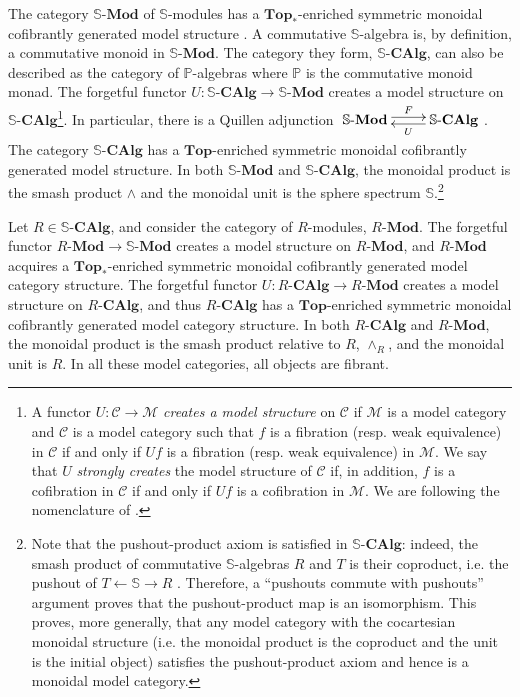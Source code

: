\documentclass[a4paper,11pt]{amsart} %
\theoremstyle{definition} \newtheorem{defn}[equation]{Definition}
\theoremstyle{remark} \newtheorem{notation}[equation]{Notation}
\theoremstyle{plain} \newtheorem{teo}[equation]{Theorem}
\theoremstyle{plain} \newtheorem{lema}[equation]{Lemma}
\theoremstyle{plain} \newtheorem{prop}[equation]{Proposition}
\theoremstyle{plain} \newtheorem{corolario}[equation]{Corollary}
\theoremstyle{remark} \newtheorem{obs}[equation]{Remark}
\theoremstyle{remark} \newtheorem{sideobs}[equation]{Side remark}
\theoremstyle{remark} \newtheorem{ejercicio}[equation]{Exercise}
\theoremstyle{definition} \newtheorem{notn}[equation]{Notation}
\theoremstyle{remark} \newtheorem{ej}[equation]{Example}
\theoremstyle{remark} \newtheorem{contraej}[equation]{Counterexample}
\theoremstyle{plain} \newtheorem{conj}[equation]{Conjecture}
\renewcommand{\1}{\ensuremath{\mathbbm{1}}}
\renewcommand{\S}{\mathbb{S}}
\newcommand{\RMod}{\ensuremath{R}\mbox{-}\mathbf{Mod}}
\newcommand{\SCAlg}{\ensuremath{\mathbb{S}}\mbox{-}\ensuremath{\mathbf{CAlg}}}
\newcommand{\RCAlg}{\ensuremath{R}\mbox{-}\ensuremath{\mathbf{CAlg}}}
\newcommand{\SMod}{\ensuremath{\mathbb{S}}\mbox{-}\ensuremath{\textbf{Mod}}}
\newcommand{\Top}{\ensuremath{\mathbf{Top}}}
\numberwithin{equation}{section}
\begin{document}
The category $\SMod$ of $\S$-modules has a $\Top_*$-enriched symmetric monoidal cofibrantly generated model structure \cite[VII.4]{ekmm}. %
A commutative $\S$-algebra is, by definition, a commutative monoid in $\SMod$. The category they form, $\SCAlg$, can also be described as the category of $\mathbb P$-algebras where $\mathbb P$ is the commutative monoid monad. The forgetful functor $U:\SCAlg\to \SMod$ creates a model structure on $\SCAlg$\footnote{A functor $U:\mathcal C\to \mathcal M$ \emph{creates a model structure} on $\mathcal C$ if $\mathcal M$ is a model category and $\mathcal C$ is a model category such that $f$ is a fibration (resp. weak equivalence) in $\mathcal C$ if and only if $Uf$ is a fibration (resp. weak equivalence) in $\mathcal M$. We say that $U$ \emph{strongly creates} the model structure of $\mathcal C$ if, in addition, $f$ is a cofibration in $\mathcal C$ if and only if $Uf$ is a cofibration in $\mathcal M$. We are following the nomenclature of \cite[15.3.5]{mayponto}.}. In particular, there is a Quillen adjunction $\xymatrix{\SMod\ar@<.2pc>[r]^-F  &   \ar@<.2pc>[l]^-U \SCAlg}$. The category $\SCAlg$ has a $\Top$-enriched symmetric monoidal cofibrantly generated model structure. In both $\SMod$ and $\SCAlg$, the monoidal product is the smash product $\wedge$ and the monoidal unit is the sphere spectrum $\S$.\footnote{Note that the pushout-product axiom is satisfied in $\SCAlg$: indeed, the smash product of commutative $\S$-algebras $R$ and $T$ is their coproduct, i.e. the pushout of $T \leftarrow \S \to R$ \cite[II.3.7]{ekmm}. Therefore, a ``pushouts commute with pushouts'' argument proves that the pushout-product map is an isomorphism. This proves, more generally, that any model category with the cocartesian monoidal structure (i.e. the monoidal product is the coproduct and the unit is the initial object) satisfies the pushout-product axiom and hence is a monoidal model category.}
%

Let $R\in \SCAlg$, and consider the category of $R$-modules, $\RMod$. The forgetful functor $\RMod\to \SMod$ creates a model structure on $\RMod$, and $\RMod$ acquires a $\Top_*$-enriched symmetric monoidal cofibrantly generated model category structure. The forgetful functor $U:\RCAlg\to \RMod$ creates a model structure on $\RCAlg$, and thus $\RCAlg$ has a $\Top$-enriched symmetric monoidal cofibrantly generated model category structure. In both $\RCAlg$ and $\RMod$, the monoidal product is the smash product relative to $R$, $\wedge_R$, and the monoidal unit is $R$. In all these model categories, all objects are fibrant.
\end{document}
